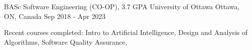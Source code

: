 
\begin{cventries}

  \cventry
    {BASc Software Engineering (CO-OP), 3.7 GPA} %
    {University of Ottawa} %
    {Ottawa, ON, Canada} %
    {Sep 2018 - Apr 2023} %
    {
    \begin{cvitems} %
        \item {Recent courses completed: Intro to Artificial Intelligence, Design and Analysis of Algorithms, Software Quality Assurance,}
    \end{cvitems}
    }
\vspace{-0.3cm}

\end{cventries}
